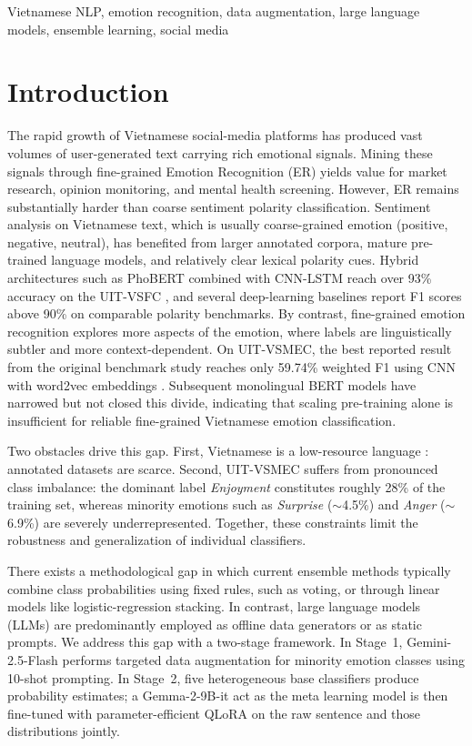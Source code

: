 \documentclass[conference]{IEEEtran}
\begin{document}
\begin{IEEEkeywords}
Vietnamese NLP, emotion recognition, data augmentation, large language models,
ensemble learning, social media
\end{IEEEkeywords}

\section{Introduction}

The rapid growth of Vietnamese social-media platforms has produced vast volumes of user-generated text carrying rich emotional signals. Mining
these signals through fine-grained Emotion Recognition (ER) yields value for market
research, opinion monitoring, and mental health screening. However, ER remains substantially
harder than coarse sentiment polarity classification. Sentiment analysis on Vietnamese
text, which is usually coarse-grained emotion (positive, negative, neutral), has
benefited from larger annotated corpora, mature pre-trained language models, and
relatively clear lexical polarity cues. Hybrid architectures such as PhoBERT combined
with CNN-LSTM reach over 93\% accuracy on the UIT-VSFC
\cite{nguyen2018vsfc,nguyen2018deeplearning,nguyen2025phobert}, and several deep-learning
baselines report F1 scores above 90\% on comparable polarity benchmarks. By contrast, fine-grained emotion recognition explores more aspects of the emotion, where labels are linguistically subtler and more context-dependent. On UIT-VSMEC, the best reported result from the original benchmark study reaches only 59.74\% weighted F1 using CNN with word2vec embeddings
\cite{ho2020emotion}. Subsequent monolingual BERT models have narrowed but not closed this divide, indicating that scaling pre-training alone is insufficient for reliable fine-grained Vietnamese emotion classification.

Two obstacles drive this gap. First, Vietnamese is a low-resource language \cite{duong2021review,mai2025neuesc}: annotated datasets are scarce. Second, UIT-VSMEC suffers from pronounced class imbalance: the dominant label \textit{Enjoyment} constitutes roughly 28\% of the training set, whereas minority emotions such as \textit{Surprise} ($\sim$4.5\%) and \textit{Anger}
($\sim$6.9\%) are severely underrepresented. Together, these constraints limit the robustness and generalization of individual classifiers.

There exists a methodological gap in which current ensemble methods typically combine class probabilities using fixed rules, such as voting, or through linear models like logistic-regression stacking. In contrast, large language models (LLMs) are predominantly employed as offline data generators or as static prompts. We address this gap with a two-stage framework. In Stage~1, Gemini-2.5-Flash \cite{comanici2025gemini}
performs targeted data augmentation for minority emotion classes using 10-shot prompting. In Stage~2, five heterogeneous base classifiers produce probability estimates; a Gemma-2-9B-it \cite{gemma_2024} act as the meta learning model is then fine-tuned with parameter-efficient QLoRA \cite{dettmers2023qlora} on the raw sentence and those distributions jointly.
\end{document}
